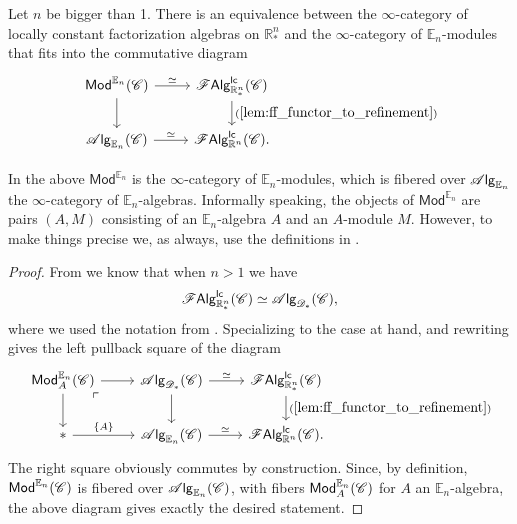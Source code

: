 \documentclass[../text]{subfiles}
\begin{document}
\begin{theorem}\label{thm:classif_Rn*}
    Let $n$ be bigger than 1. There is an equivalence between the $\infty$-category of locally constant factorization algebras on $\mathbb{R}^n_*$ and the $\infty$-category of $\mathbb{E}_n$-modules that fits into the commutative diagram
    \begin{equation}
        \begin{tikzcd}
            \mathsf{Mod}^{\mathbb{E}_n} (\catC) \arrow[r, "\simeq"] \arrow[d] & \lcfa_{\mathbb{R}^n_*} (\catC) \arrow[d, "(\ref{lem:ff_functor_to_refinement})"] \\
            \alg{\mathbb{E}_n} (\catC) \arrow[r, "\simeq"] & \lcfa_{\mathbb{R}^n} (\catC).
        \end{tikzcd}
    \end{equation}
\end{theorem}

\begin{remark}
    In the above $\mathsf{Mod}^{\mathbb{E}_n}$ is the $\infty$-category of $\mathbb{E}_n$-modules, which is fibered over $\mathscr{A} \mathsf{lg}_{\mathbb{E}_n}$ the $\infty$-category of $\mathbb{E}_n$-algebras. Informally speaking, the objects of $\mathsf{Mod}^{\mathbb{E}_n}$ are pairs $(A, M)$ consisting of an $\mathbb{E}_n$-algebra $A$ and an $A$-module $M$. However, to make things precise we, as always, use the definitions in \cite[ch.3]{lurie_ha}.
\end{remark}


\begin{proof}
    From  we know that when $n > 1$ we have
    \begin{equation}
        \mathscr{F} \mathsf{Alg}^{\mathsf{lc}}_{\mathbb{R}^n_*} (\mathscr{C}) \simeq \mathscr{A} \mathsf{lg}_{\mathscr{D}_*} (\mathscr{C}),
    \end{equation}
    where we used the notation from . Specializing  to the case at hand, and rewriting gives the left pullback square of the diagram
    \begin{equation}
        \begin{tikzcd}
            \mathsf{Mod}^{\mathbb{E}_n}_A (\catC) \arrow[dr, phantom, "\ulcorner", very near start] \arrow[r] \arrow[d] & \alg{\mathscr{D}_*} (\catC) \arrow[d] \arrow[r, "\simeq"] & \lcfa_{\mathbb{R}^n_*} (\catC) \arrow[d, "(\ref{lem:ff_functor_to_refinement})"] \\
            * \arrow[r, "\{A\}"] & \alg{\mathbb{E}_n} (\catC) \arrow[r, "\simeq"] & \lcfa_{\mathbb{R}^n} (\catC).
        \end{tikzcd}
    \end{equation}
    The right square obviously commutes by construction. Since, by definition, $\mathsf{Mod}^{\mathbb{E}_n} (\mathscr{C})$ is fibered over $\mathscr{A} \mathsf{lg}_{\mathbb{E}_n} (\mathscr{C})$, with fibers $\mathsf{Mod}^{\mathbb{E}_n}_A (\mathscr{C})$ for $A$ an $\mathbb{E}_n$-algebra, the above diagram gives exactly the desired statement.
\end{proof}
\end{document}
